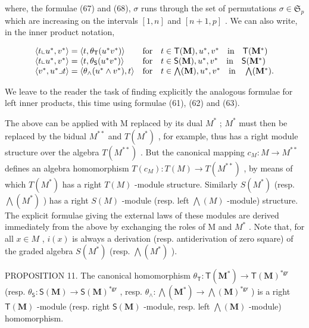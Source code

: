 where, the formulae (67) and (68), \(\sigma\) runs through the set of permutations \(\sigma \in \mathfrak{S}_p\) which are increasing on the intervals \([1, n]\) and \([n + 1, p]\) . We can also write, in the inner product notation,

\[
\begin{array}{l l} \langle t \llcorner u ^ {*}, v ^ {*} \rangle = \langle t, \theta_ {\mathsf {T}} (u ^ {*} v ^ {*}) \rangle & \text {for} \quad t \in \mathsf {T} (\mathbf {M}), u ^ {*}, v ^ {*} \quad \text {in} \quad \mathsf {T} (\mathbf {M} ^ {*}) \\ \langle t \llcorner u ^ {*}, v ^ {*} \rangle = \langle t, \theta_ {\mathsf {S}} (u ^ {*} v ^ {*}) \rangle & \text {for} \quad t \in \mathsf {S} (\mathbf {M}), u ^ {*}, v ^ {*} \quad \text {in} \quad \mathsf {S} (\mathbf {M} ^ {*}) \\ \langle v ^ {*}, u ^ {*} \lrcorner t \rangle = \langle \theta_ {\wedge} (u ^ {*} \wedge v ^ {*}), t \rangle & \text {for} \quad t \in \bigwedge (\mathbf {M}), u ^ {*}, v ^ {*} \quad \text {in} \quad \bigwedge (\mathbf {M} ^ {*}). \end{array}
\]

We leave to the reader the task of finding explicitly the analogous formulae for left inner products, this time using formulae (61), (62) and (63).

The above can be applied with M replaced by its dual \(M^{*}\) ; \(M^{*}\) must then be replaced by the bidual \(M^{**}\) and \(T(M^{*})\) , for example, thus has a right module structure over the algebra \(T(M^{**})\) . But the canonical mapping \(c_{M}: M \to M^{**}\) defines an algebra homomorphism \(T(c_{M}): T(M) \to T(M^{**})\) , by means of which \(T(M^{*})\) has a right \(T(M)\) -module structure. Similarly \(S(M^{*})\) (resp. \(\bigwedge(M^{*})\) ) has a right \(S(M)\) -module (resp. left \(\bigwedge(M)\) -module) structure. The explicit formulae giving the external laws of these modules are derived immediately from the above by exchanging the roles of M and \(M^{*}\) . Note that, for all \(x \in M\) , \(i(x)\) is always a derivation (resp. antiderivation of zero square) of the graded algebra \(S(M^{*})\) (resp. \(\bigwedge(M^{*})\) ).

PROPOSITION 11. The canonical homomorphism \(\theta_{\mathsf{T}}: \mathsf{T}(\mathbf{M}^{*}) \to \mathsf{T}(\mathbf{M})^{*\mathsf{gr}}\) (resp. \(\theta_{\mathsf{S}}: \mathsf{S}(\mathbf{M}) \to \mathsf{S}(\mathbf{M})^{*\mathsf{gr}}\) , resp. \(\theta_{\wedge}: \bigwedge (\mathbf{M}^{*}) \to \bigwedge (\mathbf{M})^{*\mathsf{gr}}\) ) is a right \(\mathsf{T}(\mathbf{M})\) -module (resp. right \(\mathsf{S}(\mathbf{M})\) -module, resp. left \(\bigwedge (\mathbf{M})\) -module) homomorphism.

